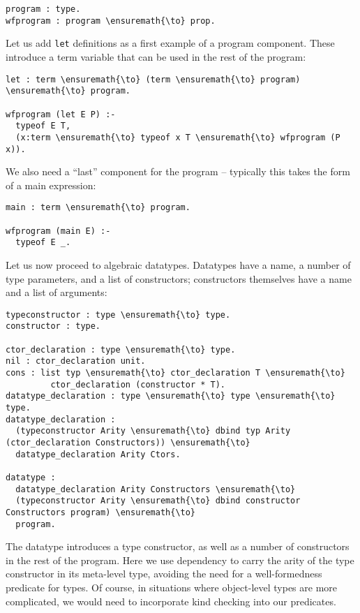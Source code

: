 \begin{verbatim}
program : type.
wfprogram : program \ensuremath{\to} prop.
\end{verbatim}

Let us add \texttt{let} definitions as a first example of a program
component. These introduce a term variable that can be used in the rest
of the program:

\begin{verbatim}
let : term \ensuremath{\to} (term \ensuremath{\to} program) \ensuremath{\to} program.

wfprogram (let E P) :-
  typeof E T,
  (x:term \ensuremath{\to} typeof x T \ensuremath{\to} wfprogram (P x)).
\end{verbatim}

We also need a ``last'' component for the program -- typically this
takes the form of a main expression:

\begin{verbatim}
main : term \ensuremath{\to} program.

wfprogram (main E) :-
  typeof E _.
\end{verbatim}

Let us now proceed to algebraic datatypes. Datatypes have a name, a
number of type parameters, and a list of constructors; constructors
themselves have a name and a list of arguments:

\begin{verbatim}
typeconstructor : type \ensuremath{\to} type.
constructor : type.

ctor_declaration : type \ensuremath{\to} type.
nil : ctor_declaration unit.
cons : list typ \ensuremath{\to} ctor_declaration T \ensuremath{\to}
         ctor_declaration (constructor * T).
datatype_declaration : type \ensuremath{\to} type \ensuremath{\to} type.
datatype_declaration : 
  (typeconstructor Arity \ensuremath{\to} dbind typ Arity (ctor_declaration Constructors)) \ensuremath{\to}
  datatype_declaration Arity Ctors.

datatype :
  datatype_declaration Arity Constructors \ensuremath{\to}
  (typeconstructor Arity \ensuremath{\to} dbind constructor Constructors program) \ensuremath{\to}
  program.
\end{verbatim}

The datatype introduces a type constructor, as well as a number of
constructors in the rest of the program. Here we use dependency to carry
the arity of the type constructor in its meta-level type, avoiding the
need for a well-formedness predicate for types. Of course, in situations
where object-level types are more complicated, we would need to
incorporate kind checking into our predicates.

